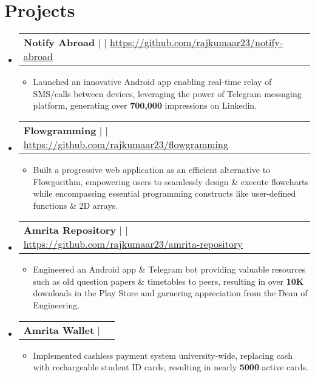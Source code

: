 \documentclass[letterpaper,11pt]{article}
\makeatletter
\newcommand{\resumeItem}[1]{
  \item\small{
    {#1 \vspace{-2pt}}
  }
}
\newcommand{\resumeProjectHeading}[2]{
    \item
    \begin{tabular*}{1.001\textwidth}{l@{\extracolsep{\fill}}r}
      \small#1 & \textbf{\small #2}\\
    \end{tabular*}\vspace{-7pt}
}
\newcommand{\resumeSubHeadingListStart}{\begin{itemize}[leftmargin=0.0in, label={}]}
\newcommand{\resumeSubHeadingListEnd}{\end{itemize}}
\newcommand{\resumeItemListStart}{\begin{itemize}}
\newcommand{\resumeItemListEnd}{\end{itemize}\vspace{-5pt}}
\makeatother
\begin{document}
\section{Projects}
    \vspace{-5pt}
    \resumeSubHeadingListStart
        \resumeProjectHeading
          {\textbf{Notify Abroad} $|$ \text{Android, Java} $|$ \href{https://github.com/rajkumaar23/notify-abroad}{\underline{https://github.com/rajkumaar23/notify-abroad}}}{}
          \resumeItemListStart
            \resumeItem{Launched an innovative Android app enabling real-time relay of SMS/calls between devices, leveraging the power of Telegram messaging platform, generating over \textbf{700,000} impressions on Linkedin.}
          \resumeItemListEnd 
         \vspace{-17pt}
    \resumeProjectHeading
          {\textbf{Flowgramming} $|$ \text{HTML, Bootstrap, jQuery,  JointJS} $|$ \href{https://github.com/rajkumaar23/flowgramming/}{\underline{https://github.com/rajkumaar23/flowgramming}}}{}
          \resumeItemListStart
            \resumeItem{Built a progressive web application as an efficient alternative to Flowgorithm, empowering users to seamlessly design \& execute flowcharts while encompassing essential programming constructs like user-defined functions \& 2D arrays.}
          \resumeItemListEnd 
          \vspace{-17pt}
      \resumeProjectHeading
          {\textbf{Amrita Repository} $|$ \text{Android, SQLite, Web Scraping, PHP, Python} $|$ \href{https://github.com/rajkumaar23/amrita-repository}{\underline{https://github.com/rajkumaar23/amrita-repository}}}{}
          \resumeItemListStart
            \resumeItem{Engineered an Android app  \& Telegram bot providing valuable resources such as old question papers \& timetables to peers, resulting in over \textbf{10K} downloads in the Play Store and garnering appreciation from the Dean of Engineering.}
          \resumeItemListEnd
          \vspace{-17pt}
      \resumeProjectHeading
          {\textbf{Amrita Wallet} $|$ \text{Android, NodeJS, MongoDB, VueJS}}{}
          \resumeItemListStart
            \resumeItem{Implemented cashless payment system university-wide, replacing cash with rechargeable student ID cards, resulting in nearly \textbf{5000} active cards.}
          \resumeItemListEnd 
    \resumeSubHeadingListEnd
\vspace{-10pt}


%
\end{document}
